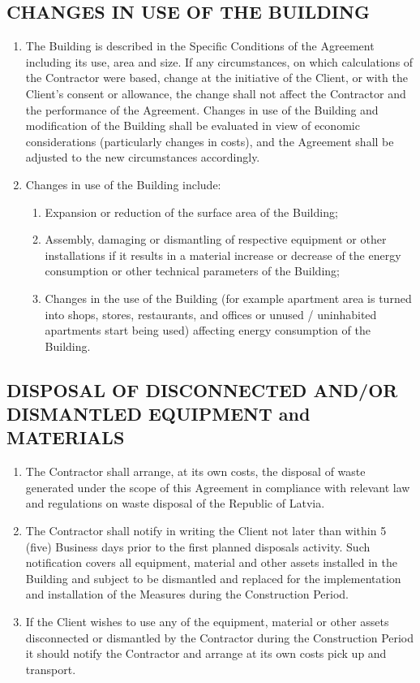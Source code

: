 \begin{multicols}{2}
\subsection{CHANGES IN USE OF THE BUILDING}
\begin{enumerate}
	\item	The Building is described in the Specific Conditions of the Agreement including its use, area and size. If any circumstances, on which calculations of the Contractor were based, change at the initiative of the Client, or with the Client’s consent or allowance, the change shall not affect the Contractor and the performance of the Agreement. Changes in use of the Building and modification of the Building shall be evaluated in view of economic considerations (particularly changes in costs), and the Agreement shall be adjusted to the new circumstances accordingly.
	\item	Changes in use of the Building include:
	\begin{enumerate}
		\item	Expansion or reduction of the surface area of the Building;
		\item	Assembly, damaging or dismantling of respective equipment or other installations if it results in a material increase or decrease of the energy consumption or other technical parameters of the Building;
		\item	Changes in the use of the Building (for example apartment area is turned into shops, stores, restaurants, and offices or unused / uninhabited apartments start being used) affecting energy consumption of the Building.
	\end{enumerate}
\end{enumerate}


\subsection{DISPOSAL OF DISCONNECTED AND/OR DISMANTLED EQUIPMENT and MATERIALS}
\begin{enumerate}
	\item	The Contractor shall arrange, at its own costs, the disposal of waste generated under the scope of this Agreement in compliance with relevant law and regulations on waste disposal of the Republic of Latvia.
	\item	The Contractor shall notify in writing the Client not later than within 5 (five) Business days prior to the first planned disposals activity. Such notification covers all equipment, material and other assets installed in the Building and subject to be dismantled and replaced for the implementation and installation of the Measures during the Construction Period.
	\item	If the Client wishes to use any of the equipment, material or other assets disconnected or dismantled by the Contractor during the Construction Period it should notify the Contractor and arrange at its own costs pick up and transport.
\end{enumerate}


\end{multicols}
